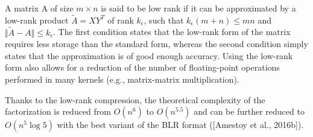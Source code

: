 A matrix A of size $ m \times n $ is said to be low rank if it can be approximated by a low-rank product $ \tilde{A} = XY^{T}$ of rank $ k_{\epsilon} $, such that $ k_{\epsilon}(m+n)\leq mn $ and $ \Vert \tilde{A} - A \Vert \leq  k_{\epsilon} $. The first condition states that the low-rank form of the matrix requires less storage than the standard form, whereas the second condition simply states that the approximation is of good enough accuracy. Using the low-rank form also allows for a reduction of the number of floating-point operations performed in many kernels (e.g., matrix-matrix multiplication).

Thanks to the low-rank compression, the theoretical complexity of the factorization is reduced from $ O(n^{6})$ to $ O(n^{5.5})$ and can be further reduced to $ O(n^{5} \log 5 )$ with the best variant of the BLR format ([Amestoy et al., 2016b]).

